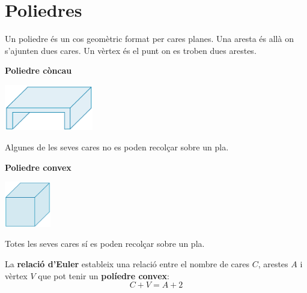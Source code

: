 \pagebreak

\section{ Poliedres }

\begin{theorybox}
 Un poliedre és un cos geomètric format per cares planes. Una aresta és allà on s'ajunten dues cares. Un vèrtex és el punt on es troben dues arestes.

 \begin{multicols}{2}
 	 	\centering
 	 \textbf{Poliedre còncau}
 	
 	\includegraphics[height=2cm]{img-11/poliedro-concavo}
 	
  {\scriptsize	Algunes de les seves cares no es poden recolçar sobre un pla.}
 	
 	\textbf{Poliedre convex}
 		
 	\includegraphics[height=2cm]{img-11/poliedro-convexo}
 	
 	{\scriptsize	Totes les seves cares sí es poden recolçar sobre un pla.}
 \end{multicols}
	
 La \textbf{relació d'Euler} estableix una relació entre el nombre de cares ${C}$, arestes $A$ i vèrtex $V$ que pot tenir un \textbf{políedre convex}:	
 \[C+V=A+2\]
 
\end{theorybox}

